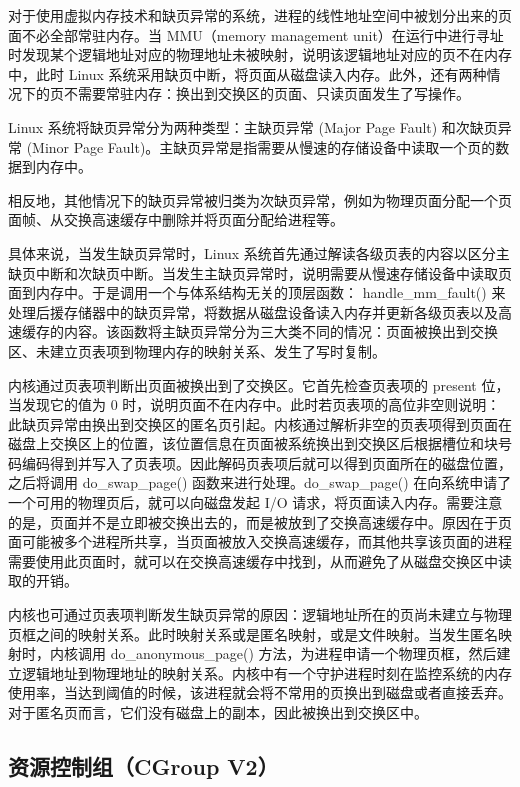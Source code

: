 对于使用虚拟内存技术和缺页异常的系统，进程的线性地址空间中被划分出来的页面不必全部常驻内存。当 MMU（memory management unit）在运行中进行寻址时发现某个逻辑地址对应的物理地址未被映射，说明该逻辑地址对应的页不在内存中，此时 Linux 系统采用缺页中断，将页面从磁盘读入内存。此外，还有两种情况下的页不需要常驻内存：换出到交换区的页面、只读页面发生了写操作。

Linux 系统将缺页异常分为两种类型：主缺页异常 (Major Page Fault) 和次缺页异常 (Minor Page Fault)。主缺页异常是指需要从慢速的存储设备中读取一个页的数据到内存中。

相反地，其他情况下的缺页异常被归类为次缺页异常，例如为物理页面分配一个页面帧、从交换高速缓存中删除并将页面分配给进程等。

具体来说，当发生缺页异常时，Linux 系统首先通过解读各级页表的内容以区分主缺页中断和次缺页中断。当发生主缺页异常时，说明需要从慢速存储设备中读取页面到内存中。于是调用一个与体系结构无关的顶层函数： handle\_mm\_fault() 来处理后援存储器中的缺页异常，将数据从磁盘设备读入内存并更新各级页表以及高速缓存的内容。该函数将主缺页异常分为三大类不同的情况：页面被换出到交换区、未建立页表项到物理内存的映射关系、发生了写时复制。

内核通过页表项判断出页面被换出到了交换区。它首先检查页表项的 present 位，当发现它的值为 0 时，说明页面不在内存中。此时若页表项的高位非空则说明：此缺页异常由换出到交换区的匿名页引起。内核通过解析非空的页表项得到页面在磁盘上交换区上的位置，该位置信息在页面被系统换出到交换区后根据槽位和块号码编码得到并写入了页表项。因此解码页表项后就可以得到页面所在的磁盘位置，之后将调用 do\_swap\_page() 函数来进行处理。do\_swap\_page() 在向系统申请了一个可用的物理页后，就可以向磁盘发起 I/O 请求，将页面读入内存。需要注意的是，页面并不是立即被交换出去的，而是被放到了交换高速缓存中。原因在于页面可能被多个进程所共享，当页面被放入交换高速缓存，而其他共享该页面的进程需要使用此页面时，就可以在交换高速缓存中找到，从而避免了从磁盘交换区中读取的开销。

内核也可通过页表项判断发生缺页异常的原因：逻辑地址所在的页尚未建立与物理页框之间的映射关系。此时映射关系或是匿名映射，或是文件映射。当发生匿名映射时，内核调用 do\_anonymous\_page() 方法，为进程申请一个物理页框，然后建立逻辑地址到物理地址的映射关系。内核中有一个守护进程时刻在监控系统的内存使用率，当达到阈值的时候，该进程就会将不常用的页换出到磁盘或者直接丢弃。对于匿名页而言，它们没有磁盘上的副本，因此被换出到交换区中。

\subsection{资源控制组（CGroup V2）}


